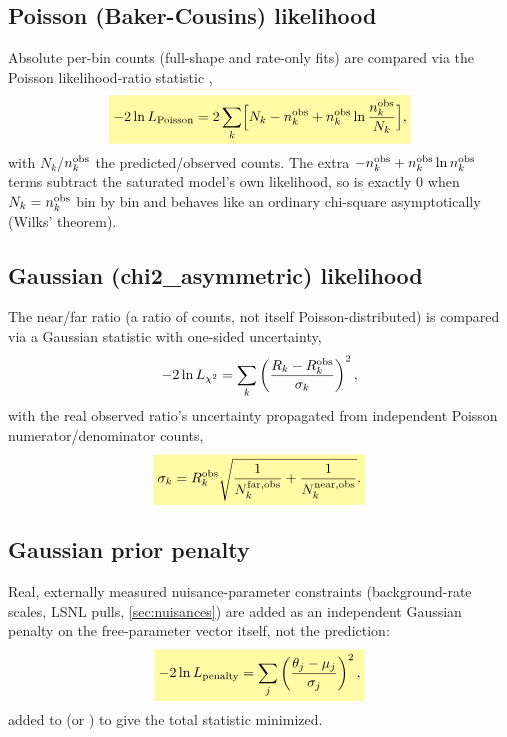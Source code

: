 \begin{theorybox}
\subsection*{Poisson (Baker-Cousins) likelihood}
Absolute per-bin counts (full-shape and rate-only fits) are compared via
the Poisson likelihood-ratio statistic \parencite{BakerCousins1984},
\begin{equation}
  \keyresult{-2\ln L_{\rm Poisson} = 2\sum_k\Bigl[N_k-n_k^{\rm obs}+n_k^{\rm obs}
    \ln\frac{n_k^{\rm obs}}{N_k}\Bigr],}
  \label{eq:poisson-nll}
\end{equation}
with $N_k$/$n_k^{\rm obs}$ the predicted/observed counts. The extra
$-n_k^{\rm obs}+n_k^{\rm obs}\ln n_k^{\rm obs}$ terms subtract the
saturated model's own likelihood, so  is exactly
0 when $N_k=n_k^{\rm obs}$ bin by bin and behaves like an ordinary
chi-square asymptotically (Wilks' theorem).

\subsection*{Gaussian (chi2\_asymmetric) likelihood}
The near/far ratio (a ratio of counts, not itself Poisson-distributed) is
compared via a Gaussian statistic with one-sided uncertainty,
\begin{equation}
  -2\ln L_{\chi^2} = \sum_k \left(\frac{R_k-R_k^{\rm obs}}{\sigma_k}\right)^2,
  \label{eq:chi2-asymmetric}
\end{equation}
with the real observed ratio's uncertainty propagated from independent
Poisson numerator/denominator counts,
\begin{equation}
  \keyresult{\sigma_k = R_k^{\rm obs}\sqrt{\frac{1}{N_k^{\rm far,obs}}+\frac{1}{N_k^{\rm near,obs}}}.}
  \label{eq:ratio-sigma-propagation}
\end{equation}

\subsection*{Gaussian prior penalty}
Real, externally measured nuisance-parameter constraints (background-rate
scales, LSNL pulls, \cref{sec:nuisances}) are added as an independent
Gaussian penalty on the free-parameter vector itself, not the prediction:
\begin{equation}
  \keyresult{-2\ln L_{\rm penalty} = \sum_j \left(\frac{\theta_j-\mu_j}{\sigma_j}\right)^2,}
  \label{eq:gaussian-prior-penalty}
\end{equation}
added to  (or ) to
give the total statistic minimized.
\end{theorybox}

